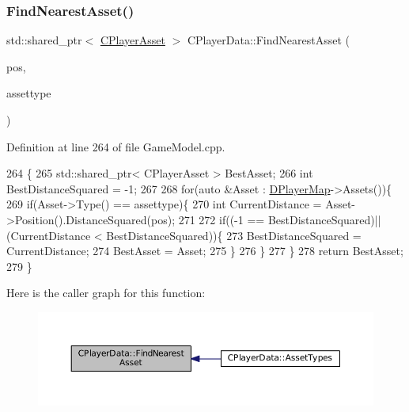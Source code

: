 \hypertarget{classCPlayerData_a5f70ad16e9b4e8aa9edc6e8fc4136527}{}\label{classCPlayerData_a5f70ad16e9b4e8aa9edc6e8fc4136527} 
\subsubsection{\texorpdfstring{Find\+Nearest\+Asset()}{FindNearestAsset()}}
{\footnotesize\ttfamily std\+::shared\+\_\+ptr$<$ \hyperlink{classCPlayerAsset}{C\+Player\+Asset} $>$ C\+Player\+Data\+::\+Find\+Nearest\+Asset (\begin{DoxyParamCaption}\item[{const \hyperlink{classCPosition}{C\+Position} \&}]{pos,  }\item[{\hyperlink{GameDataTypes_8h_a5600d4fc433b83300308921974477fec}{E\+Asset\+Type}}]{assettype }\end{DoxyParamCaption})}



Definition at line 264 of file Game\+Model.\+cpp.


\begin{DoxyCode}
264                                                                                                      \{
265     std::shared\_ptr< CPlayerAsset > BestAsset;
266     \textcolor{keywordtype}{int} BestDistanceSquared = -1;
267 
268     \textcolor{keywordflow}{for}(\textcolor{keyword}{auto} &Asset : \hyperlink{classCPlayerData_a452163191cd4603e1e38dd8d4bb9691c}{DPlayerMap}->Assets())\{
269         \textcolor{keywordflow}{if}(Asset->Type() == assettype)\{
270             \textcolor{keywordtype}{int} CurrentDistance = Asset->Position().DistanceSquared(pos);
271             
272             \textcolor{keywordflow}{if}((-1 == BestDistanceSquared)||(CurrentDistance < BestDistanceSquared))\{
273                 BestDistanceSquared = CurrentDistance;
274                 BestAsset = Asset;
275             \}
276         \}
277     \}
278     \textcolor{keywordflow}{return} BestAsset;
279 \}
\end{DoxyCode}
Here is the caller graph for this function\+:
\nopagebreak
\begin{figure}[H]
\begin{center}
\leavevmode
\includegraphics[width=350pt]{classCPlayerData_a5f70ad16e9b4e8aa9edc6e8fc4136527_icgraph}
\end{center}
\end{figure}
\hypertarget{classCPlayerData_a5f0a1280933f7bb9a65ab256ecff1a69}{}\label{classCPlayerData_a5f0a1280933f7bb9a65ab256ecff1a69} 
